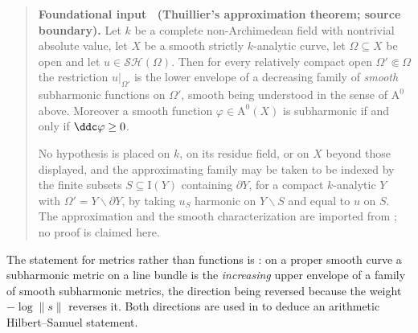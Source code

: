 \label{thm:ch19-thuillier-approximation}
\begin{quote}
\textbf{Foundational input \thetheorem\ (Thuillier's approximation
theorem; source boundary).}
Let $k$ be a complete non-Archimedean field with nontrivial absolute value,
let $X$ be a smooth strictly $k$-analytic curve, let
$\Omega\subseteq X$ be open and let $u\in\mathcal{SH}(\Omega)$.  Then for
every relatively compact open $\Omega'\Subset\Omega$ the restriction
$u|_{\Omega'}$ is the lower envelope of a decreasing family of
\emph{smooth} subharmonic functions on $\Omega'$, smooth being understood
in the sense of $\mathrm A^0$ above.  Moreover a smooth function
$\varphi\in\mathrm A^0(X)$ is subharmonic if and only if
$\ddc\varphi\geq0$.

No hypothesis is placed on $k$, on its residue field, or on $X$ beyond
those displayed, and the approximating family may be taken to be indexed by
the finite subsets $S\subseteq\mathrm I(Y)$ containing $\partial Y$, for
a compact $k$-analytic $Y$ with $\Omega'=Y\smallsetminus\partial Y$,
by taking $u_S$ harmonic on $Y\smallsetminus S$ and equal to $u$ on
$S$.
The approximation and the smooth characterization are imported from
\cite[Thm.~3.4.2, Prop.~3.4.4]{Thu05}; no proof is claimed here.
\end{quote}

The statement for metrics rather than functions is
\cite[Thm.~3.4.19]{Thu05}: on a proper smooth curve a subharmonic metric on
a line bundle is the \emph{increasing} upper envelope of a family of smooth
subharmonic metrics, the direction being reversed because the weight
$-\log\|s\|$ reverses it.  Both directions are used in
\cite[\S4.3.3]{Thu05} to deduce an arithmetic Hilbert--Samuel statement.


